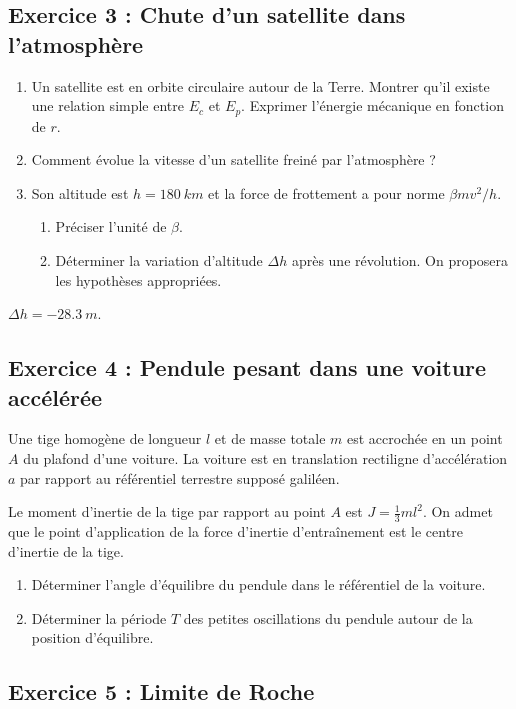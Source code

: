 \subsection{Exercice 3 : Chute d'un satellite dans l'atmosphère}

\begin{enumerate}
	\item Un satellite est en orbite circulaire autour de la Terre. Montrer qu'il existe une relation simple entre $E_c$ et $E_p$. Exprimer l'énergie mécanique en fonction de $r$.
	\item Comment évolue la vitesse d'un satellite freiné par l'atmosphère ?
	\item Son altitude est $h=\SI{180}{km}$ et la force de frottement a pour norme $\beta m v^2 / h$.
	\begin{enumerate}
		\item Préciser l'unité de $\beta$.
		\item Déterminer la variation d'altitude $\Delta h$ après une révolution. On proposera les hypothèses appropriées.
	\end{enumerate}
\end{enumerate}

 $\Delta h = \SI{-28.3}{m}$.

\subsection{Exercice 4 : Pendule pesant dans une voiture accélérée}

Une tige homogène de longueur $l$ et de masse totale $m$ est accrochée en un point $A$ du plafond d'une voiture. La voiture est en translation rectiligne d'accélération $a$ par rapport au référentiel terrestre supposé galiléen. 

Le moment d'inertie de la tige par rapport au point $A$ est $J = \frac{1}{3}m l ^2$. On admet que le point d'application de la force d'inertie d'entraînement est le centre d'inertie de la tige.

\begin{enumerate}
	\item Déterminer l'angle d'équilibre du pendule dans le référentiel de la voiture.
	\item Déterminer la période $T$ des petites oscillations du pendule autour de la position d'équilibre.
\end{enumerate}

\subsection{Exercice 5 : Limite de Roche}

